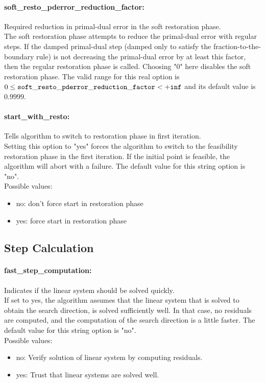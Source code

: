 \paragraph{soft\_resto\_pderror\_reduction\_factor:}\label{sec:soft_resto_pderror_reduction_factor} Required reduction in primal-dual error in the soft restoration phase. $\;$ \\
 The soft restoration phase attempts to reduce the
primal-dual error with regular steps. If the
damped primal-dual step (damped only to satisfy
the fraction-to-the-boundary rule) is not
decreasing the primal-dual error by at least this
factor, then the regular restoration phase is
called. Choosing "0" here disables the soft
restoration phase. The valid range for this real option is 
$0 \le {\tt soft\_resto\_pderror\_reduction\_factor } <  {\tt +inf}$
and its default value is $0.9999$.


\paragraph{start\_with\_resto:}\label{sec:start_with_resto} Tells algorithm to switch to restoration phase in first iteration. $\;$ \\
 Setting this option to "yes" forces the algorithm
to switch to the feasibility restoration phase in
the first iteration. If the initial point is
feasible, the algorithm will abort with a failure.
The default value for this string option is "no".
\\ 
Possible values:
\begin{itemize}
   \item no: don't force start in restoration phase
   \item yes: force start in restoration phase
\end{itemize}

\subsection{Step Calculation}
\label{sec:Step_Calculation}
\paragraph{fast\_step\_computation:}\label{sec:fast_step_computation} Indicates if the linear system should be solved quickly. $\;$ \\
 If set to yes, the algorithm assumes that the
linear system that is solved to obtain the search
direction, is solved sufficiently well. In that
case, no residuals are computed, and the
computation of the search direction is a little
faster.
The default value for this string option is "no".
\\ 
Possible values:
\begin{itemize}
   \item no: Verify solution of linear system by computing
residuals.
   \item yes: Trust that linear systems are solved well.
\end{itemize}

